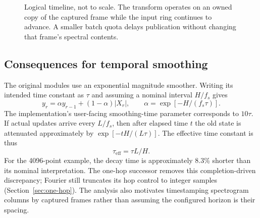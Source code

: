 \documentclass[11pt,letterpaper]{article}
\begin{document}
\begin{figure}[tb]
\centering
{}
\caption{Logical timeline, not to scale. The transform operates on an owned copy of the captured frame while the input ring continues to advance. A smaller batch quota delays publication without changing that frame's spectral contents.}
\label{fig:timeline}
\end{figure}

\subsection{Consequences for temporal smoothing}
The original modules use an exponential magnitude smoother. Writing its intended time
constant as $\tau$ and assuming a nominal interval $H/f_s$ gives
\begin{equation}
 y_r=\alpha y_{r-1}+(1-\alpha)|X_r|,\qquad
 \alpha=\exp[-H/(f_s\tau)].
\end{equation}
The implementation's user-facing smoothing-time parameter corresponds to
$10\tau$. If actual updates arrive every $L/f_s$, then after elapsed time $t$
the old state is attenuated approximately by
$\exp[-tH/(L\tau)]$. The effective time constant is thus
\begin{equation}
 \tau_{\mathrm{eff}}=\tau L/H.
\end{equation}
For the 4096-point example, the decay time is approximately 8.3\% shorter than
its nominal interpretation. The one-hop successor removes this completion-driven discrepancy; Fourier
still truncates its hop control to integer samples (Section~\ref{sec:one-hop}). The analysis also motivates timestamping
spectrogram columns by captured frames rather than assuming the configured
horizon is their spacing.
\end{document}
